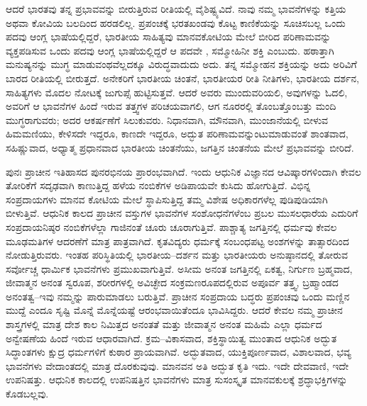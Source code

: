 ಆದರೆ ಭಾರತವು ತನ್ನ ಪ್ರಭಾವವನ್ನು ಬೀರುತ್ತಿರುವ ರೀತಿಯಲ್ಲಿ ವೈಶಿಷ್ಟ್ಯವಿದೆ. ನಾವು ನಮ್ಮ ಭಾವನೆಗಳನ್ನು ಕತ್ತಿಯ ಅಥವಾ ಕೋವಿಯ ಬಲದಿಂದ ಹರಡಲಿಲ್ಲ. ಪ್ರಪಂಚಕ್ಕೆ ಭರತಖಂಡವು ಕೊಟ್ಟ ಕಾಣಿಕೆಯನ್ನು ಸೂಚಿಸಬಲ್ಲ ಒಂದು ಪದವು ಆಂಗ್ಲ ಭಾಷೆಯಲ್ಲಿದ್ದರೆ, ಭಾರತೀಯ ಸಾಹಿತ್ಯವು ಮಾನವಕೋಟಿಯ ಮೇಲೆ ಬೀರಿದ ಪರಿಣಾಮವನ್ನು ವ್ಯಕ್ತಪಡಿಸುವ ಒಂದು ಪದವು ಆಂಗ್ಲ ಭಾಷೆಯಲ್ಲಿದ್ದರೆ ಆ ಪದವೇ , ಸಮ್ಮೋಹಿನೀ ಶಕ್ತಿ ಎಂಬುದು. ಹಠಾತ್ತಾಗಿ ಮನುಷ್ಯನನ್ನು ಮುಗ್ಧ ಮಾಡುವಂಥವೆಲ್ಲದಕ್ಕೂ ವಿರುದ್ಧವಾದುದು ಅದು. ತನ್ನ ಸಮ್ಮೋಹನ ಶಕ್ತಿಯನ್ನು ಅದು ಅರಿವಿಗೆ ಬಾರದ ರೀತಿಯಲ್ಲಿ ಬೀರುತ್ತದೆ. ಅನೇಕರಿಗೆ ಭಾರತೀಯ ಚಿಂತನೆ, ಭಾರತೀಯರ ರೀತಿ ನೀತಿಗಳು, ಭಾರತೀಯ ದರ್ಶನ, ಸಾಹಿತ್ಯಗಳು ಮೊದಲ ನೋಟಕ್ಕೆ ಜುಗುಪ್ಸೆ ಹುಟ್ಟಿಸುತ್ತವೆ. ಆದರೆ ಅವರು ಮುಂದುವರಿಯಲಿ, ಅವುಗಳನ್ನು ಓದಲಿ, ಅವರಿಗೆ ಆ ಭಾವನೆಗಳ ಹಿಂದೆ ಇರುವ ತತ್ತ್ವಗಳ ಪರಿಚಯವಾಗಲಿ, ಆಗ ನೂರರಲ್ಲಿ ತೊಂಬತ್ತೊಂಬತ್ತು ಮಂದಿ ಮುಗ್ಧರಾಗುವರು; ಅದರ ಆಕರ್ಷಣೆಗೆ ಸಿಲುಕುವರು. ನಿಧಾನವಾಗಿ, ಮೌನವಾಗಿ, ಮುಂಜಾನೆಯಲ್ಲಿ ಬೀಳುವ ಹಿಮಮಣಿಯು, ಕೇಳಿಸದೇ ಇದ್ದರೂ, ಕಾಣದೇ ಇದ್ದರೂ, ಅದ್ಭುತ ಪರಿಣಾಮವನ್ನುಂಟುಮಾಡುವಂತೆ ಶಾಂತವಾದ, ಸಹಿಷ್ಣುವಾದ, ಅಧ್ಯಾತ್ಮ ಪ್ರಧಾನವಾದ ಭಾರತೀಯ ಚಿಂತನೆಯು, ಜಗತ್ತಿನ ಚಿಂತನೆಯ ಮೇಲೆ ಪ್ರಭಾವವನ್ನು ಬೀರಿದೆ.

ಪುನಃ ಪ್ರಾಚೀನ ಇತಿಹಾಸದ ಪುನರಭಿನಯ ಪ್ರಾರಂಭವಾಗಿದೆ. ಇಂದು ಆಧುನಿಕ ವಿಜ್ಞಾನದ ಆವಿಷ್ಕಾರಗಳಿಂದಾಗಿ ಕೇವಲ ತೋರಿಕೆಗೆ ಸದೃಢವಾಗಿ ಕಾಣುತ್ತಿದ್ದ ಹಳೆಯ ನಂಬಿಕೆಗಳ ಅಡಿಪಾಯವೇ ಕುಸಿದು ಹೋಗುತ್ತಿದೆ. ವಿಭಿನ್ನ ಸಂಪ್ರದಾಯಗಳು ಮಾನವ ಕೋಟಿಯ ಮೇಲೆ ಸ್ಥಾಪಿಸುತ್ತಿದ್ದ ತಮ್ಮ ವಿಶೇಷ ಅಧಿಕಾರಗಳೆಲ್ಲ ಪುಡಿಪುಡಿಯಾಗಿ ಬೀಳುತ್ತಿವೆ. ಆಧುನಿಕ ಕಾಲದ ಪ್ರಾಚೀನ ವಸ್ತುಗಳ ಭಾವನೆಗಳ ಸಂಶೋಧನೆಗಳೆಂಬ ಪ್ರಬಲ ಮುಸಲಧಾರೆಯ ಎದುರಿಗೆ ಸಂಪ್ರದಾಯನಿಷ್ಠರ ನಂಬಿಕೆಗಳೆಲ್ಲಾ ಗಾಜಿನಂತೆ ಚೂರು ಚೂರಾಗುತ್ತಿವೆ. ಪಾಶ್ಚಾತ್ಯ ಜಗತ್ತಿನಲ್ಲಿ ಧರ್ಮವು ಕೇವಲ ಮೂಢಮತಿಗಳ ಆದರಣೆಗೆ ಮಾತ್ರ ಪಾತ್ರವಾಗಿದೆ. ಕೃತವಿದ್ಯರು ಧರ್ಮಕ್ಕೆ ಸಂಬಂಧಪಟ್ಟ ಅಂಶಗಳನ್ನು ತಾತ್ಸಾರದಿಂದ ನೋಡುತ್ತಿರುವರು. ಇಂತಹ ಪರಿಸ್ಥಿತಿಯಲ್ಲಿ ಭಾರತೀಯ–ದರ್ಶನ ಮತ್ತು ಭಾರತೀಯರು ಅನುಷ್ಠಾನದಲ್ಲಿ ತೋರುವ ಸರ್ವೋಚ್ಚ ಧಾರ್ಮಿಕ ಭಾವನೆಗಳು ಪ್ರಮುಖವಾಗುತ್ತಿವೆ. ಅಸೀಮ ಅನಂತ ಜಗತ್ತಿನಲ್ಲಿ ಏಕತ್ವ, ನಿರ್ಗುಣ ಬ್ರಹ್ಮವಾದ, ಜೀವಾತ್ಮನ ಅನಂತ ಸ್ವರೂಪ, ಶರೀರಗಳಲ್ಲಿ ಅವಿಚ್ಛೇದ ಸಂಕ್ರಮಣರೂಪದಲ್ಲಿರುವ ಅಪೂರ್ವ ತತ್ತ್ವ, ಬ್ರಹ್ಮಾಂಡದ ಅನಂತತ್ವ–ಇವು ನಮ್ಮನ್ನು ಪಾರುಮಾಡಲು ಬರುತ್ತಿವೆ. ಪ್ರಾಚೀನ ಸಂಪ್ರದಾಯ ಬದ್ಧರು ಪ್ರಪಂಚವು ಒಂದು ಮಣ್ಣಿನ ಮುದ್ದೆ ಎಂದೂ ಸೃಷ್ಟಿ ಮೊನ್ನೆ ಮೊನ್ನೆಯಷ್ಟೆ ಆರಂಭವಾಯಿತೆಂದೂ ಭಾವಿಸಿದ್ದರು. ಆದರೆ ಕೇವಲ ನಮ್ಮ ಪ್ರಾಚೀನ ಶಾಸ್ತ್ರಗಳಲ್ಲಿ ಮಾತ್ರ ದೇಶ ಕಾಲ ನಿಮಿತ್ತದ ಅನಂತತೆ ಮತ್ತು ಜೀವಾತ್ಮನ ಅನಂತ ಮಹಿಮೆ ಎಲ್ಲಾ ಧರ್ಮದ ಅನ್ವೇಷಣೆಯ ಹಿಂದೆ ಇರುವ ಆಧಾರವಾಗಿದೆ. ಕ್ರಮ–ವಿಕಾಸವಾದ, ಶಕ್ತಿಸ್ಥಾಯಿತ್ವ  ಮುಂತಾದ ಆಧುನಿಕ ಅದ್ಭುತ ಸಿದ್ಧಾಂತಗಳು ಕ್ಷುದ್ರ ಧರ್ಮಗಳಿಗೆ ಕುಠಾರ ಪ್ರಾಯವಾಗಿವೆ. ಅದ್ಭುತವಾದ, ಯುಕ್ತಿಪೂರ್ಣವಾದ, ವಿಶಾಲವಾದ, ಭವ್ಯ ಭಾವನೆಗಳು ವೇದಾಂತದಲ್ಲಿ ಮಾತ್ರ ದೊರಕುವುವು. ಮಾನವನ ಅತಿ ಅದ್ಭುತ ಕೃತಿ ಇದು. ಇದೇ ದೇವವಾಣಿ, ಇದೇ ಉಪನಿಷತ್ತು. ಆಧುನಿಕ ಕಾಲದಲ್ಲಿ ಉಪನಿಷತ್ತಿನ ಭಾವನೆಗಳು ಮಾತ್ರ ಸುಸಂಸ್ಕೃತ ಮಾನವಕುಲಕ್ಕೆ ಶ್ರದ್ಧಾಭಕ್ತಿಗಳನ್ನು ಕೊಡಬಲ್ಲವು.

\newpage

